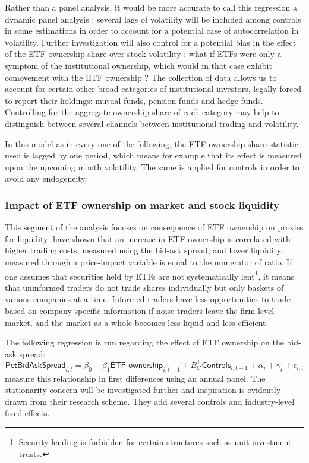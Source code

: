 Rather than a panel analysis, it would be more accurate to call this regression a dynamic panel analysis : several lags of volatility will be included among controls in some estimations in order to account for a potential case of autocorrelation in volatility. Further investigation will also control for a potential bias in the effect of the ETF ownership share over stock volatility : what if ETFs were only a symptom of the institutional ownership, which would in that case exhibit comovement with the ETF ownership ? The collection of data allows us to account for certain other broad categories of institutional investors, legally forced to report their holdings: mutual funds, pension funds and hedge funds. Controlling for the aggregate ownership share of each category may help to distinguish between several channels between institutional trading and volatility.

In this model as in every one of the following, the ETF ownership share statistic used is lagged by one period, which means for example that its effect is measured upon the upcoming month volatility. The same is applied for controls in order to avoid any endogeneity.
\subsubsection{Impact of ETF ownership on market and stock liquidity}
\label{subsec:Method:Liquidity}
This segment of the analysis focuses on consequence of ETF ownership on proxies for liquidity: \textcite{Israeli2017} have shown that an increase in ETF ownership is correlated with higher trading costs, measured using the bid-ask spread, and lower liquidity, measured through a price-impact variable is equal to the numerator of \textcite{Amihud2002} ratio. If one assumes that securities held by ETFs are not systematically lent\footnote{Security lending is forbidden for certain structures such as unit investment trusts.}, it means that uninformed traders do not trade shares individually but only baskets of various companies at a time. Informed traders have less opportunities to trade based on company-specific information if noise traders leave the firm-level market, and the market as a whole becomes less liquid and less efficient.

The following regression is run regarding the effect of ETF ownership on the bid-ask spread:
\begin{equation}
 \mathsf{PctBidAskSpread}_{i,t} = \beta_{0} + \beta_{1} \mathsf{ETF\_ownership}_{i, t - 1} + B_{C}^{\intercal} \mathsf{Controls}_{i, t - 1} + \alpha_{i} + \gamma_{t} + \epsilon_{i, t}
\end{equation}
\textcite{Israeli2017} measure this relationship in first differences using an annual panel. The stationarity concern will be investigated further and inspiration is evidently drawn from their research scheme. They add several controls and industry-level fixed effects.

